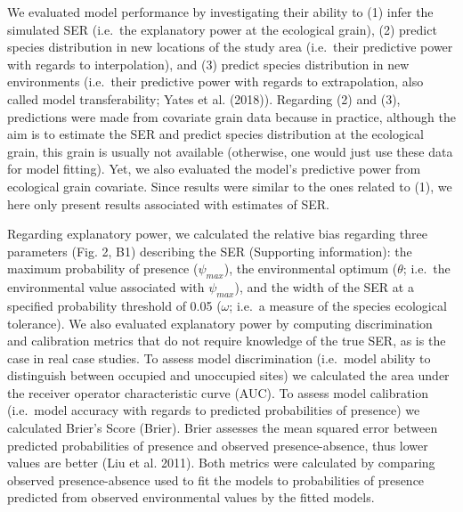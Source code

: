 \documentclass[
  12pt,
  a4paper]{article}
\begin{document}
We evaluated model performance by investigating their ability to (1) infer the simulated SER (i.e.~the explanatory power at the ecological grain), (2) predict species distribution in new locations of the study area (i.e.~their predictive power with regards to interpolation), and (3) predict species distribution in new environments (i.e.~their predictive power with regards to extrapolation, also called model transferability; Yates et al. (2018)). Regarding (2) and (3), predictions were made from covariate grain data because in practice, although the aim is to estimate the SER and predict species distribution at the ecological grain, this grain is usually not available (otherwise, one would just use these data for model fitting). Yet, we also evaluated the model's predictive power from ecological grain covariate. Since results were similar to the ones related to (1), we here only present results associated with estimates of SER.

Regarding explanatory power, we calculated the relative bias regarding three parameters (Fig. 2, B1) describing the SER (Supporting information): the maximum probability of presence (\(\psi_{max}\)), the environmental optimum (\(\theta\); i.e.~the environmental value associated with \(\psi_{max}\)), and the width of the SER at a specified probability threshold of 0.05 (\(\omega\); i.e.~a measure of the species ecological tolerance). We also evaluated explanatory power by computing discrimination and calibration metrics that do not require knowledge of the true SER, as is the case in real case studies. To assess model discrimination (i.e.~model ability to distinguish between occupied and unoccupied sites) we calculated the area under the receiver operator characteristic curve (AUC). To assess model calibration (i.e.~model accuracy with regards to predicted probabilities of presence) we calculated Brier's Score (Brier). Brier assesses the mean squared error between predicted probabilities of presence and observed presence-absence, thus lower values are better (Liu et al. 2011). Both metrics were calculated by comparing observed presence-absence used to fit the models to probabilities of presence predicted from observed environmental values by the fitted models.
\end{document}
